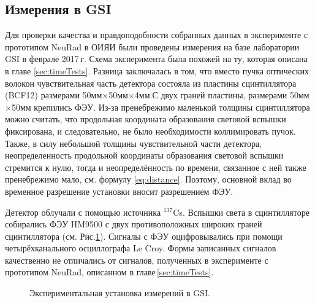 \subsection{Измерения в GSI}
\label{sec:timeTestsGSI}
Для проверки качества и правдоподобности собранных данных в эксперименте с прототипом NeuRad в ОИЯИ были проведены измерения на базе лаборатории GSI в феврале 2017\,г. Схема эксперимента была похожей на ту, которая описана в главе \ref{sec:timeTests}.
Разница заключалась в том, что вместо пучка оптических волокон чувствительная часть детектора состояла из пластины сцинтиллятора (BCF12) размерами 50мм$\times$50мм$\times$4мм.С двух граней пластины, размерами 50мм$\times$50мм крепились ФЭУ. Из-за пренебрежимо маленькой толщины сцинтиллятора можно считать, что продольная координата образования световой вспышки фиксирована, и следовательно, не было необходимости коллимировать пучок. 
Также, в силу небольшой толщины чувствительной части детектора, неопределенность продольной координаты образования световой вспышки стремится к нулю, тогда и неопределённость по времени, связанное с  ней также пренебрежимо мало, см. формулу \ref{eq:distance}. Поэтому, основной вклад во временное разрешение установки вносит разрешением ФЭУ. 

Детектор облучали с помощью источника $^{137}$Cs. Вспышки света в сцинтилляторе собирались ФЭУ HM9500 с двух противоположных широких граней сцинтиллятора (см. Рис.\ref{ris:gsiexp}). Сигналы с ФЭУ оцифровывались при помощи четырёхканального осциллографа Le Croy. Формы записанных сигналов качественно не отличались от сигналов, полученных в эксперименте с прототипом NeuRad, описанном в главе\,\ref{sec:timeTests}. 


\begin{figure}[!ht]
	\caption{Экспериментальная установка измерений в GSI.}
	\label{ris:gsiexp}
\end{figure}

